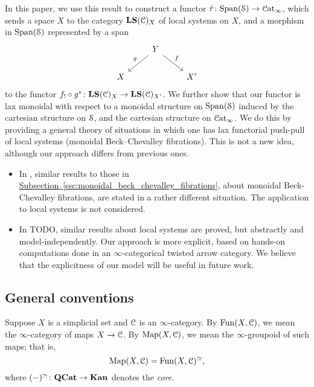 \documentclass[main.tex]{subfiles}
\begin{document}
In this paper, we use this result to construct a functor $\hat{r}\colon \Span(\category{S}) \to \ICat$, which sends a space $X$ to the category $\LS(\category{C})_{X}$ of local systems on $X$, and a morphism in $\Span(\S)$ represented by a span
\begin{equation*}
  \begin{tikzcd}
    & Y
    \arrow[dl, swap, "g"]
    \arrow[dr, "f"]
    \\
    X
    && X'
  \end{tikzcd}
\end{equation*}
to the functor $f_{!} \circ g^{*}\colon \LS(\category{C})_{X} \to \LS(\category{C})_{X'}$. We further show that our functor is lax monoidal with respect to a monoidal structure on $\Span(\S)$ induced by the cartesian structure on $\S$, and the cartesian structure on $\ICat$. We do this by providing a general theory of situations in which one has lax functorial push-pull of local systems (monoidal Beck--Chevalley fibrations). This is not a new idea, although our approach differs from previous ones.

\begin{itemize}
  \item In \cite{spectralmackeyfunctors2}, similar results to those in \hyperref[ssc:monoidal_beck_chevalley_fibrations]{Subsection~\ref*{ssc:monoidal_beck_chevalley_fibrations}}, about monoidal Beck-Chevalley fibrations, are stated in a rather different situation. The application to local systems is not considered.

  \item In TODO, similar results about local systems are proved, but abstractly and model-independently. Our approach is more explicit, based on hands-on computations done in an $\infty$-categorical twisted arrow category. We believe that the explicitness of our model will be useful in future work.
\end{itemize}


\subsection{General conventions}
\label{ssc:general_conventions}

Suppose $X$ is a simplicial set and $\category{C}$ is an $\infty$-category. By $\Fun(X, \category{C})$, we mean the $\infty$-category of maps $X \to \category{C}$. By $\Map(X, \category{C})$, we mean the $\infty$-groupoid of such maps; that is,
\begin{equation*}
  \Map(X, \category{C}) = \Fun(X, \category{C})^{\simeq},
\end{equation*}
where $(-)^{\simeq}\colon \QCat \to \Kan$ denotes the \emph{core.}
\end{document}
